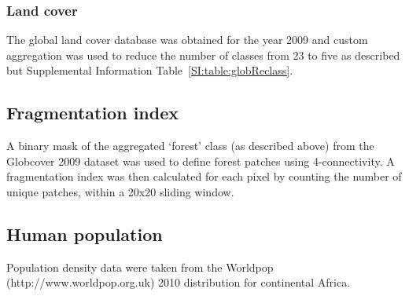 \documentclass[9pt,twoside,lineno]{pnas-new}
\begin{document}
\subsubsection*{Land cover}
\label{Land cover}
The global land cover database \cite{Olivier2012Global2009} was obtained for the year 2009 and custom aggregation was used to reduce the number of classes from 23 to five as described but Supplemental Information Table~\ref{SI:table:globReclass}.\par

\subsection*{Fragmentation index}
A binary mask of the aggregated `forest' class (as described above) from the Globcover 2009 dataset \cite{Olivier2012Global2009} was used to define forest patches using 4-connectivity.
A fragmentation index was then calculated for each pixel by counting the number of unique patches, within a 20x20 sliding window. \par

\subsection*{Human population}
Population density data were taken from the Worldpop (http://www.worldpop.org.uk) 2010 distribution for continental Africa.


\end{document}
